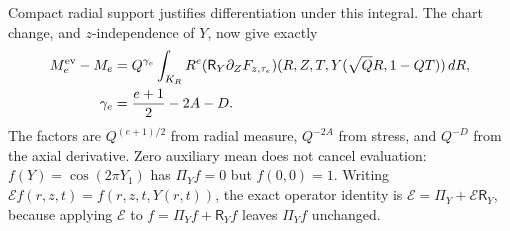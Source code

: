 Compact radial support justifies differentiation under this integral.
The chart change, and $z$-independence of $Y$, now give exactly
\begin{equation}
\begin{split}
M_e^{\rm ev}-M_e
&=Q^{\gamma_e}\int_{K_R}R^e
(\mathsf R_Y\partial_ZF_{z,\tau_e})
(R,Z,T,Y(\sqrt QR,1-QT))\,dR,\\
\gamma_e&=\frac{e+1}{2}-2A-D .
\end{split}\label{eflux:evaluation-bound}
\end{equation}
The factors are $Q^{(e+1)/2}$ from radial measure, $Q^{-2A}$ from
stress, and $Q^{-D}$ from the axial derivative.
Zero auxiliary mean does not cancel evaluation:
$f(Y)=\cos(2\pi Y_1)$ has $\Pi_Yf=0$ but $f(0,0)=1$.
Writing $\mathcal Ef(r,z,t)=f(r,z,t,Y(r,t))$, the exact operator
identity is $\mathcal E=\Pi_Y+\mathcal E\mathsf R_Y$, because applying
$\mathcal E$ to $f=\Pi_Yf+\mathsf R_Yf$ leaves $\Pi_Yf$ unchanged.

